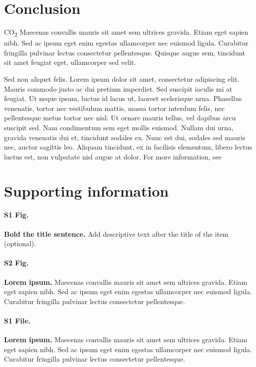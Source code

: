 \documentclass[10pt,letterpaper]{article}
\begin{document}
\section*{Conclusion}

CO\textsubscript{2} Maecenas convallis mauris sit amet sem ultrices gravida. Etiam eget sapien nibh. Sed ac ipsum eget enim egestas ullamcorper nec euismod ligula. Curabitur fringilla pulvinar lectus consectetur pellentesque. Quisque augue sem, tincidunt sit amet feugiat eget, ullamcorper sed velit. 

Sed non aliquet felis. Lorem ipsum dolor sit amet, consectetur adipiscing elit. Mauris commodo justo ac dui pretium imperdiet. Sed suscipit iaculis mi at feugiat. Ut neque ipsum, luctus id lacus ut, laoreet scelerisque urna. Phasellus venenatis, tortor nec vestibulum mattis, massa tortor interdum felis, nec pellentesque metus tortor nec nisl. Ut ornare mauris tellus, vel dapibus arcu suscipit sed. Nam condimentum sem eget mollis euismod. Nullam dui urna, gravida venenatis dui et, tincidunt sodales ex. Nunc est dui, sodales sed mauris nec, auctor sagittis leo. Aliquam tincidunt, ex in facilisis elementum, libero lectus luctus est, non vulputate nisl augue at dolor. For more information, see %

\section*{Supporting information}

\paragraph*{S1 Fig.}
\label{S1_Fig}
{\bf Bold the title sentence.} Add descriptive text after the title of the item (optional).

\paragraph*{S2 Fig.}
\label{S2_Fig}
{\bf Lorem ipsum.} Maecenas convallis mauris sit amet sem ultrices gravida. Etiam eget sapien nibh. Sed ac ipsum eget enim egestas ullamcorper nec euismod ligula. Curabitur fringilla pulvinar lectus consectetur pellentesque.

\paragraph*{S1 File.}
\label{S1_File}
{\bf Lorem ipsum.}  Maecenas convallis mauris sit amet sem ultrices gravida. Etiam eget sapien nibh. Sed ac ipsum eget enim egestas ullamcorper nec euismod ligula. Curabitur fringilla pulvinar lectus consectetur pellentesque.
\end{document}
